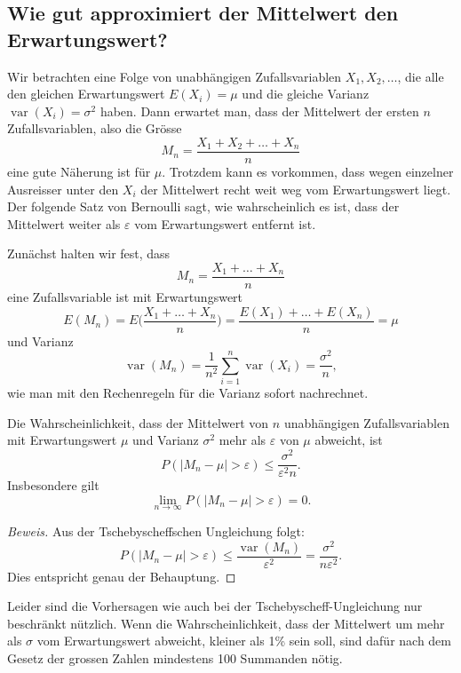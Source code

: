 \subsection{Wie gut approximiert der Mittelwert den Erwartungswert?} \label{approximation-mittelwert}
Wir betrachten eine Folge von unabhängigen Zufallsvariablen $X_1, X_2,\dots$, die
alle den gleichen Erwartungswert $E(X_i)=\mu$ und die gleiche Varianz
$\operatorname{var}(X_i)=\sigma^2$ haben.
Dann erwartet man, dass 
der Mittelwert der ersten $n$ Zufallsvariablen, also die
Grösse
\[
M_n=\frac{X_1+X_2+\dots+X_n}{n}
\]
eine gute Näherung ist für $\mu$. Trotzdem kann es vorkommen, dass wegen
einzelner Ausreisser unter den $X_i$ der Mittelwert recht weit weg
vom Erwartungswert liegt.
Der folgende Satz von Bernoulli sagt, wie wahrscheinlich
es ist, dass der Mittelwert weiter als $\varepsilon$ vom Erwartungswert
entfernt ist.

Zunächst halten wir fest, dass
\[
M_n=\frac{X_1+\dots+X_n}{n}
\]
eine Zufallsvariable ist mit Erwartungswert
\[
E(M_n)=E\biggl(\frac{X_1+\dots+X_n}{n}\biggr)
=\frac{E(X_1)+\dots+E(X_n)}{n}=\mu
\]
und Varianz
\[
\operatorname{var}(M_n) =\frac1{n^2}\sum_{i=1}^n\operatorname{var}(X_i)
=\frac{\sigma^2}n,
\]
wie man mit den Rechenregeln für die Varianz sofort nachrechnet.

\begin{satz}
Die Wahrscheinlichkeit, dass der Mittelwert von $n$ unabhängigen Zufallsvariablen
mit Erwartungswert $\mu$ und Varianz $\sigma^2$ mehr als $\varepsilon$ von $\mu$
abweicht, ist
\[
P(|M_n-\mu|>\varepsilon)\le \frac{\sigma^2}{\varepsilon^2n}.
\]
Insbesondere gilt
\[
\lim_{n\to\infty}P(|M_n-\mu|>\varepsilon)=0.
\]
\end{satz}
\begin{proof}[Beweis]
Aus der Tschebyscheffschen Ungleichung folgt:
\[
P(|M_n-\mu|>\varepsilon)\le\frac{\operatorname{var}(M_n)}{\varepsilon^2}=
\frac{\sigma^2}{n\varepsilon^2}.
\]
Dies entspricht genau der Behauptung.
\end{proof}
Leider sind die Vorhersagen wie auch bei der Tschebyscheff-Ungleichung
nur beschränkt nützlich.
Wenn die Wahrscheinlichkeit, dass der Mittelwert
um mehr als $\sigma$ vom Erwartungswert abweicht, kleiner als 1\% sein
soll, sind dafür nach dem Gesetz der grossen Zahlen mindestens 100 Summanden
nötig.

